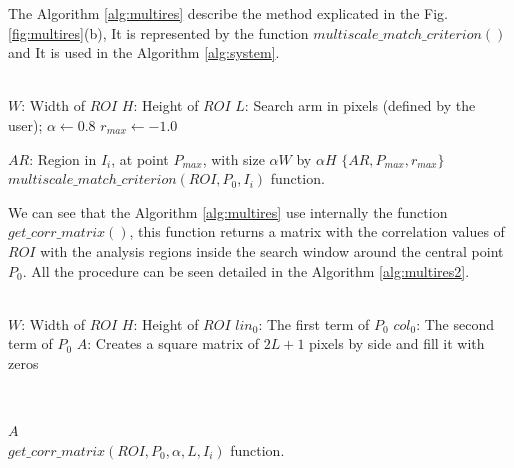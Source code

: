 The Algorithm \ref{alg:multires} describe the method explicated in the 
Fig. \ref{fig:multires}(b), It is represented by the function 
$multiscale\_match\_criterion()$ and It is used in the Algorithm \ref{alg:system}.

\begin{algorithm}[H]
 ~\\
 $W$: Width of $ROI$\;
 $H$: Height of $ROI$\;
 $L$: Search arm in pixels (defined by the user);
 $\alpha \leftarrow 0.8$\;
 $r_{max} \leftarrow -1.0$\;
 ~\\
    
$AR$: Region in $I_i$, at point $P_{max}$, with size $\alpha W$ by $\alpha H$\;      
\Return $\{AR,P_{max},r_{max}\}$\;
~\\
\caption{$multiscale\_match\_criterion(ROI,P_0,I_i)$ function.}
\label{alg:multires}
\end{algorithm}
We can see that the Algorithm \ref{alg:multires} use internally
the function $get\_corr\_matrix()$, this function returns a matrix 
with the correlation values of $ROI$ with the analysis regions
inside the search window around the central point $P_0$. 
All the procedure can be seen detailed in the Algorithm \ref{alg:multires2}.

\begin{algorithm}[H]
 ~\\
 $W$: Width of $ROI$\;
 $H$: Height of $ROI$\;
 $lin_0$: The first term of $P_0$\;
 $col_0$: The second term of $P_0$\;
 $A$: Creates a square matrix of $2L+1$ pixels by side and fill it with zeros\;

 ~\\
    
\Return $A$\;
~\\
\caption{$get\_corr\_matrix(ROI,P_0,\alpha,L,I_i)$ function.}
\label{alg:multires2}
\end{algorithm}


